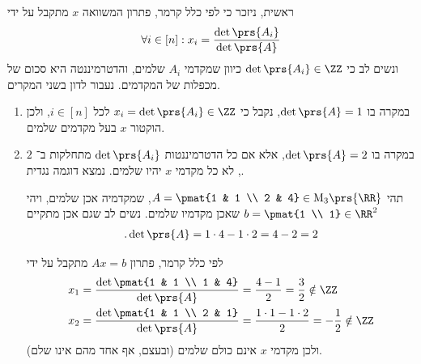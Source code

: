 \documentclass[a4paper,10pt,twoside,openany]{book}
\renewcommand{\Mat}{\mathrm{M}}
\begin{document}
\begin{solution}
ראשית, ניזכר כי לפי כלל קרמר, פתרון המשוואה
$x$
מתקבל על ידי
\begin{align*}
\forall i \in [n]: x_i = \frac{\det\prs{A_i}}{\det\prs{A}}
\end{align*}
ונשים לב כי
$\det\prs{A_i} \in \ZZ$
כיוון שמקדמי
$A_i$
שלמים, והדטרמיננטה היא סכום של מכפלות של המקדמים. נעבור לדון בשני המקרים.

\begin{enumerate}
\item
במקרה בו
$\det\prs{A} = 1$,
נקבל כי
$x_i = \det\prs{A_i} \in \ZZ$
לכל
$i \in [n]$,
ולכן הוקטור
$x$
בעל מקדמים שלמים.

\item
במקרה בו
$\det\prs{A} = 2$,
אלא אם כל הדטרמיננטות
$\det\prs{A_i}$
מתחלקות ב־%
$2$,
לא כל מקדמי
$x$
יהיו שלמים. נמצא דוגמה נגדית.

תהי
$A = \pmat{1 & 1 \\ 2 & 4} \in \Mat_3\prs{\RR}$,
שמקדמיה אכן שלמים, ויהי
$b = \pmat{1 \\ 1} \in \RR^2$
שאכן מקדמיו שלמים.
נשים לב שגם אכן מתקיים
\begin{align*}
\text{.} \det\prs{A} = 1 \cdot 4 - 1 \cdot 2 = 4 - 2 = 2
\end{align*}

לפי כלל קרמר, פתרון
$Ax = b$
מתקבל על ידי
\begin{align*}
x_1 &= \frac{\det\pmat{1 & 1 \\ 1 & 4}}{\det\prs{A}} = \frac{4 - 1}{2} = \frac{3}{2} \notin \ZZ \\
x_2 &= \frac{\det\pmat{1 & 1 \\ 2 & 1}}{\det\prs{A}} = \frac{1 \cdot 1 - 1 \cdot 2}{2} = - \frac{1}{2} \notin \ZZ
\end{align*}
ולכן מקדמי
$x$
אינם כולם שלמים (ובעצם, אף אחד מהם אינו שלם).


\end{enumerate}
\end{solution}
\end{document}
